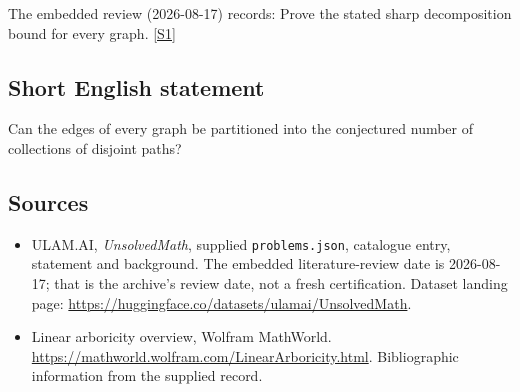 \documentclass[11pt,a4paper]{article}
\newcommand{\sref}[2]{\hyperlink{source:#1:#2}{[S#2]}}
\begin{document}
The embedded review (2026-08-17) records: Prove the stated sharp decomposition bound for every graph. \sref{statement}{1}

\subsection{Short English statement}

Can the edges of every graph be partitioned into the conjectured number of collections of disjoint paths?

\subsection{Sources}

{\small

\begin{itemize}

\item[\hypertarget{source:statement:1}{S1}] ULAM.AI, \emph{UnsolvedMath}, supplied \texttt{problems.json}, catalogue entry, statement and background. The embedded literature-review date is 2026-08-17; that is the archive’s review date, not a fresh certification. Dataset landing page: \url{https://huggingface.co/datasets/ulamai/UnsolvedMath}.

\item[\hypertarget{source:statement:2}{S2}] Linear arboricity overview, Wolfram MathWorld. \url{https://mathworld.wolfram.com/LinearArboricity.html}. Bibliographic information from the supplied record.

\end{itemize}

}

\label{end:statement}
\end{document}
